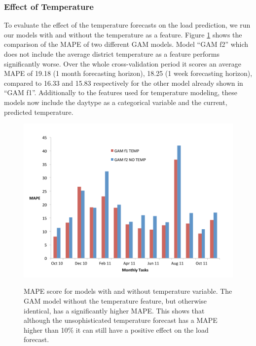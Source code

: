\documentclass[conference]{IEEEtran}
\begin{document}
\subsubsection{Effect of Temperature}
To evaluate the effect of the temperature forecasts on the load prediction, we run our models with and without the temperature as a feature. Figure \ref{fig:load-no-temperature} shows the comparison of the MAPE of two different GAM models. Model ``GAM f2'' which does not include the average district temperature as a feature performs significantly worse. Over the whole cross-validation period it scores an average MAPE of 19.18 (1 month forecasting horizon), 18.25 (1 week forecasting horizon), compared to 16.33 and 15.83 respectively for the other model already shown in ``GAM f1''. Additionally to the features used for temperature modeling, these models now include the daytype as a categorical variable and the current, predicted temperature.
\begin{figure}[!ht]
\centering
\includegraphics[width=\linewidth]{gfx/results/temp/GAM-temp-vs-no-temp-column.pdf}
\label{subfig:GAM-temp-no-temp}
\caption{MAPE score for models with and without temperature variable. The GAM model without the temperature feature, but otherwise identical, has a significantly higher MAPE. This shows that although the unsophisticated temperature forecast has a MAPE higher than 10\% it can still have a positive effect on the load forecast.} 
\label{fig:load-no-temperature}
\end{figure}
\end{document}

